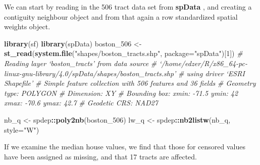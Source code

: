 \documentclass[]{book}
\newenvironment{Shaded}{\begin{snugshade}}{\end{snugshade}}
\newcommand{\CommentTok}[1]{\textcolor[rgb]{0.56,0.35,0.01}{\textit{#1}}}
\newcommand{\DataTypeTok}[1]{\textcolor[rgb]{0.13,0.29,0.53}{#1}}
\newcommand{\DecValTok}[1]{\textcolor[rgb]{0.00,0.00,0.81}{#1}}
\newcommand{\KeywordTok}[1]{\textcolor[rgb]{0.13,0.29,0.53}{\textbf{#1}}}
\newcommand{\NormalTok}[1]{#1}
\newcommand{\OperatorTok}[1]{\textcolor[rgb]{0.81,0.36,0.00}{\textbf{#1}}}
\newcommand{\StringTok}[1]{\textcolor[rgb]{0.31,0.60,0.02}{#1}}
\begin{document}
We can start by reading in the 506 tract data set from \textbf{spData} \citep{R-spData}, and creating a contiguity neighbour object and from that again a row standardized spatial weights object.

\begin{Shaded}
\begin{Highlighting}[]
\KeywordTok{library}\NormalTok{(sf)}
\KeywordTok{library}\NormalTok{(spData)}
\NormalTok{boston_}\DecValTok{506}\NormalTok{ <-}\StringTok{ }\KeywordTok{st_read}\NormalTok{(}\KeywordTok{system.file}\NormalTok{(}\StringTok{"shapes/boston_tracts.shp"}\NormalTok{, }\DataTypeTok{package=}\StringTok{"spData"}\NormalTok{)[}\DecValTok{1}\NormalTok{])}
\CommentTok{# Reading layer `boston_tracts' from data source }
\CommentTok{#   `/home/edzer/R/x86_64-pc-linux-gnu-library/4.0/spData/shapes/boston_tracts.shp' }
\CommentTok{#   using driver `ESRI Shapefile'}
\CommentTok{# Simple feature collection with 506 features and 36 fields}
\CommentTok{# Geometry type: POLYGON}
\CommentTok{# Dimension:     XY}
\CommentTok{# Bounding box:  xmin: -71.5 ymin: 42 xmax: -70.6 ymax: 42.7}
\CommentTok{# Geodetic CRS:  NAD27}
\end{Highlighting}
\end{Shaded}

\begin{Shaded}
\begin{Highlighting}[]
\NormalTok{nb_q <-}\StringTok{ }\NormalTok{spdep}\OperatorTok{::}\KeywordTok{poly2nb}\NormalTok{(boston_}\DecValTok{506}\NormalTok{)}
\NormalTok{lw_q <-}\StringTok{ }\NormalTok{spdep}\OperatorTok{::}\KeywordTok{nb2listw}\NormalTok{(nb_q, }\DataTypeTok{style=}\StringTok{"W"}\NormalTok{)}
\end{Highlighting}
\end{Shaded}

If we examine the median house values, we find that those for censored values have been assigned as missing, and that 17 tracts are affected.

\begin{Shaded}
\end{Shaded}

\begin{Shaded}
\end{Shaded}
\end{document}
